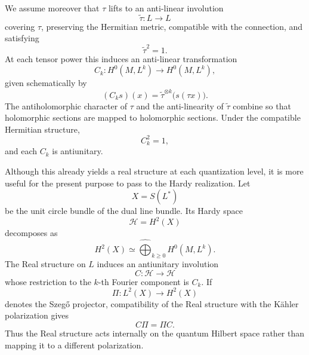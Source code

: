 \documentclass[a4paper,11pt]{article}
\theoremstyle{definition}
\newcommand{\cH}{\mathcal{H}}
\begin{document}
We assume moreover that $\tau$ lifts to an anti-linear involution
\begin{equation}
    \widetilde\tau:L\rightarrow L
\end{equation}
covering $\tau$, preserving the Hermitian metric, compatible with the
connection, and satisfying
\begin{equation}
    \widetilde\tau^2=1.
\end{equation}
At each tensor power this induces an anti-linear transformation
\begin{equation}
    C_k:
    H^0(M,L^k)
    \rightarrow
    H^0(M,L^k),
    \label{eq:ssgq:Ck}
\end{equation}
given schematically by
\begin{equation}
    (C_ks)(x)
    =
    \widetilde\tau^{\otimes k}
    \big(
       s(\tau x)
    \big).
\end{equation}
The antiholomorphic character of $\tau$ and the anti-linearity of
$\widetilde\tau$ combine so that holomorphic sections are mapped to
holomorphic sections.  Under the compatible Hermitian structure,
\begin{equation}
    C_k^2=1,
\end{equation}
and each $C_k$ is antiunitary.

Although this already yields a real structure at each quantization level, it
is more useful for the present purpose to pass to the Hardy realization.  Let
\begin{equation}
    X=S(L^*)
\end{equation}
be the unit circle bundle of the dual line bundle.  Its Hardy space
\begin{equation}
    \cH
    =
    H^2(X)
\end{equation}
decomposes as
\begin{equation}
    H^2(X)
    \simeq
    \widehat{\bigoplus}_{k\geq0}
    H^0(M,L^k).
    \label{eq:ssgq:HardyFourier}
\end{equation}
The Real structure on $L$ induces an antiunitary involution
\begin{equation}
    C:\cH\rightarrow\cH
    \label{eq:ssgq:C}
\end{equation}
whose restriction to the $k$-th Fourier component is $C_k$.  If
\begin{equation}
    \Pi:L^2(X)\rightarrow H^2(X)
\end{equation}
denotes the Szeg\H{o} projector, compatibility of the Real structure with the
K\"ahler polarization gives
\begin{equation}
    C\Pi=\Pi C.
    \label{eq:ssgq:CcommutesPi}
\end{equation}
Thus the Real structure acts internally on the quantum Hilbert space rather
than mapping it to a different polarization.
\end{document}
